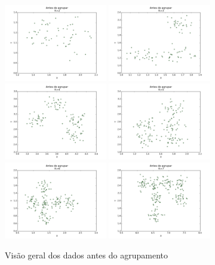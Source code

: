 \documentclass[12pt, a4paper]{article}
\begin{document}
\begin{landscape}
\begin{figure}[!ht]
  \caption{Visão geral dos dados antes do agrupamento}
  \label{antes}
  \centering
    \includegraphics[width=0.4\textwidth]{antes_k2.png}
    \includegraphics[width=0.4\textwidth]{antes_k3.png}
    \includegraphics[width=0.4\textwidth]{antes_k4.png}
    \includegraphics[width=0.4\textwidth]{antes_k5.png}
    \includegraphics[width=0.4\textwidth]{antes_k6.png}
    \includegraphics[width=0.4\textwidth]{antes_k7.png} 

\end{figure}
\end{landscape}
\end{document}
